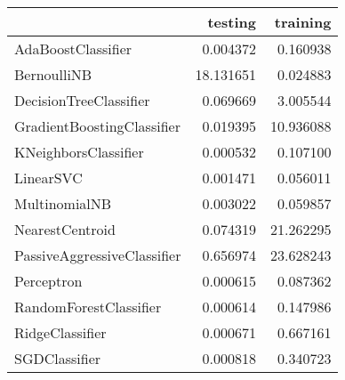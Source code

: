 \begin{tabular}{lrr}
\toprule
{} &    testing &   training \\
\midrule
AdaBoostClassifier          &   0.004372 &   0.160938 \\
BernoulliNB                 &  18.131651 &   0.024883 \\
DecisionTreeClassifier      &   0.069669 &   3.005544 \\
GradientBoostingClassifier  &   0.019395 &  10.936088 \\
KNeighborsClassifier        &   0.000532 &   0.107100 \\
LinearSVC                   &   0.001471 &   0.056011 \\
MultinomialNB               &   0.003022 &   0.059857 \\
NearestCentroid             &   0.074319 &  21.262295 \\
PassiveAggressiveClassifier &   0.656974 &  23.628243 \\
Perceptron                  &   0.000615 &   0.087362 \\
RandomForestClassifier      &   0.000614 &   0.147986 \\
RidgeClassifier             &   0.000671 &   0.667161 \\
SGDClassifier               &   0.000818 &   0.340723 \\
\bottomrule
\end{tabular}
